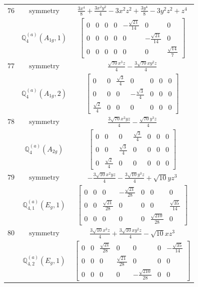 \documentclass[fleqn,8pt,landscape]{jsarticle}
\begin{document}
\begin{longtable}{ccc}
$ 76 $ & $ \text{symmetry} $ & $ \frac{3 x^{4}}{8} + \frac{3 x^{2} y^{2}}{4} - 3 x^{2} z^{2} + \frac{3 y^{4}}{8} - 3 y^{2} z^{2} + z^{4} $ \\
$  $ & $ \mathbb{Q}_{4}^{(a)}(A_{1g},1) $ & $ \begin{bmatrix} 0 & 0 & 0 & 0 & - \frac{\sqrt{21}}{14} & 0 & 0 \\ 0 & 0 & 0 & 0 & 0 & - \frac{\sqrt{21}}{14} & 0 \\ 0 & 0 & 0 & 0 & 0 & 0 & \frac{\sqrt{14}}{7} \end{bmatrix} $ \\ \hline
$ 77 $ & $ \text{symmetry} $ & $ \frac{\sqrt{70} x^{3} z}{4} - \frac{3 \sqrt{70} x y^{2} z}{4} $ \\
$  $ & $ \mathbb{Q}_{4}^{(a)}(A_{1g},2) $ & $ \begin{bmatrix} 0 & 0 & \frac{\sqrt{3}}{4} & 0 & 0 & 0 & 0 \\ 0 & 0 & 0 & - \frac{\sqrt{3}}{4} & 0 & 0 & 0 \\ \frac{\sqrt{2}}{4} & 0 & 0 & 0 & 0 & 0 & 0 \end{bmatrix} $ \\ \hline
$ 78 $ & $ \text{symmetry} $ & $ \frac{3 \sqrt{70} x^{2} y z}{4} - \frac{\sqrt{70} y^{3} z}{4} $ \\
$  $ & $ \mathbb{Q}_{4}^{(a)}(A_{2g}) $ & $ \begin{bmatrix} 0 & 0 & 0 & \frac{\sqrt{3}}{4} & 0 & 0 & 0 \\ 0 & 0 & \frac{\sqrt{3}}{4} & 0 & 0 & 0 & 0 \\ 0 & \frac{\sqrt{2}}{4} & 0 & 0 & 0 & 0 & 0 \end{bmatrix} $ \\ \hline
$ 79 $ & $ \text{symmetry} $ & $ - \frac{3 \sqrt{10} x^{2} y z}{4} - \frac{3 \sqrt{10} y^{3} z}{4} + \sqrt{10} y z^{3} $ \\
$  $ & $ \mathbb{Q}_{4,1}^{(a)}(E_{g},1) $ & $ \begin{bmatrix} 0 & 0 & 0 & - \frac{\sqrt{21}}{28} & 0 & 0 & 0 \\ 0 & 0 & \frac{\sqrt{21}}{28} & 0 & 0 & 0 & \frac{\sqrt{35}}{14} \\ 0 & 0 & 0 & 0 & 0 & \frac{\sqrt{210}}{28} & 0 \end{bmatrix} $ \\ \hline
$ 80 $ & $ \text{symmetry} $ & $ \frac{3 \sqrt{10} x^{3} z}{4} + \frac{3 \sqrt{10} x y^{2} z}{4} - \sqrt{10} x z^{3} $ \\
$  $ & $ \mathbb{Q}_{4,2}^{(a)}(E_{g},1) $ & $ \begin{bmatrix} 0 & 0 & \frac{\sqrt{21}}{28} & 0 & 0 & 0 & - \frac{\sqrt{35}}{14} \\ 0 & 0 & 0 & \frac{\sqrt{21}}{28} & 0 & 0 & 0 \\ 0 & 0 & 0 & 0 & - \frac{\sqrt{210}}{28} & 0 & 0 \end{bmatrix} $ \\ \hline

\end{longtable}
\end{document}
